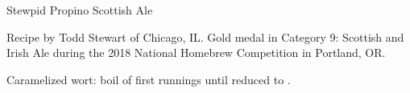 \begin{recipe}{Stewpid Propino Scottish Ale} %

\begin{aboutblock}
Recipe by Todd Stewart of Chicago, IL. Gold medal in Category 9: Scottish and Irish
Ale during the 2018 National Homebrew Competition in Portland, OR.
\sourceaha
\end{aboutblock}


\begin{methodandtiming}

\begin{mashsteps}
\end{mashsteps}

\begin{fermentationsteps}
\end{fermentationsteps}

\begin{directions}
Caramelized wort: boil  of first runnings until reduced to .
\end{directions}

\end{methodandtiming}

\recipebreak

\begin{ingredientsblock}

\begin{malts}
\end{malts}

\begin{hops}
\end{hops}


\end{ingredientsblock}

\end{recipe}

